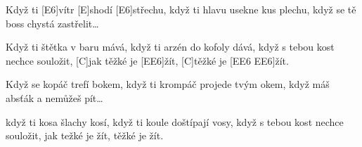 
\sloka
[E\maj]Když ti [E6]vítr [E\maj]shodí [E6]střechu,
když ti hlavu usekne kus plechu,
když se tě boss chystá zastřelit…

\sloka
Když ti štětka v baru mává,
když ti arzén do kofoly dává,
když s tebou kost nechce souložit,
[C]jak těžké je [E\maj E6]žít,
[C]těžké je [E\maj E6 E\maj E6]žít.

\sloka
Když se kopáč trefí bokem,
když ti krompáč projede tvým okem,
když máš absťák a nemůžeš pít…

\sloka
když ti kosa šlachy kosí,
když ti koule doštípají vosy,
když s tebou kost nechce souložit,
jak težké je žít, těžké je žít.
